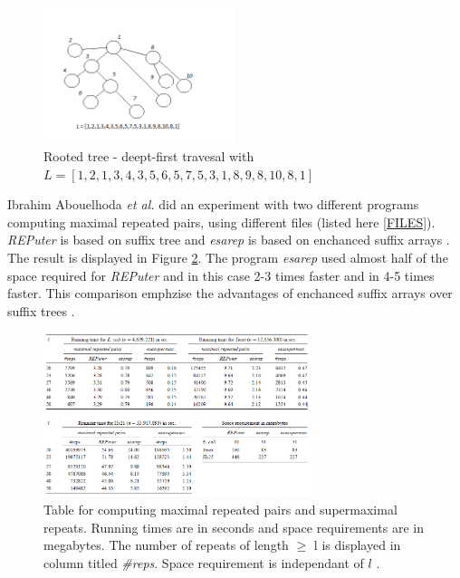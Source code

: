 \documentclass[12pt]{article} %
\begin{document}
\begin{figure}[H]
    \centering
    \includegraphics[width=0.5\textwidth]{travesal}
    \captionsetup{width=0.8\textwidth}
    \caption{Rooted tree - deept-first travesal with $L = [1,2,1,3,4,3,5,6,5,7,5,3,1,8,9,8,10,8,1]$}
    \label{fig:travesal}
\end{figure}

Ibrahim Abouelhoda \emph{et al.} did an experiment with two different programs computing maximal repeated pairs, using different files (listed here \ref{FILES})\cite{enchancedsuffix}. \emph{REPuter} is based on suffix tree and \emph{esarep} is based on enchanced suffix arrays \cite{enchancedsuffix}. The result is displayed in Figure \ref{fig:ButtomUp}.
The program \emph{esarep} used almost half of the space required for \emph{REPuter} and in this case 2-3 times faster and in 4-5 times faster. This comparison emphzise the advantages of enchanced suffix arrays over suffix trees \cite{enchancedsuffix}.
\begin{figure}[H]
    \centering
    \includegraphics[width=0.7\textwidth]{ButtomUp}
    \captionsetup{width=0.8\textwidth}
    \caption{Table for computing maximal repeated pairs and supermaximal repeats. Running times are in seconds and space requirements are in megabytes. The number of repeats of length $\geq$ l is displayed in column titled \emph{\#reps}. Space requirement is independant of $l$ \cite{enchancedsuffix}.}
    \label{fig:ButtomUp}
\end{figure}
\end{document}
